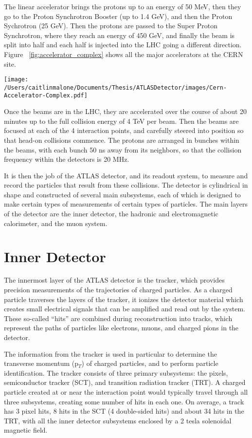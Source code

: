 The linear accelerator brings the protons up to an energy of 50 MeV, then they go to the Proton Synchrotron Booster (up to 1.4 GeV), and then the Proton Sychrotron (25 GeV).  Then the protons are passed to the Super Proton Synchrotron, where they reach an energy of 450 GeV, and finally the beam is split into half and each half is injected into the LHC going a different direction.  Figure ~\ref{fig:accelerator_complex} shows all the major accelerators at the CERN site.

\texttt{[image: /Users/caitlinmalone/Documents/Thesis/ATLASDetector/images/Cern-Accelerator-Complex.pdf]}\label{fig:accelerator_complex}

Once the beams are in the LHC, they are accelerated over the course of about 20 minutes up to the full collision energy of 4 TeV per beam.  Then the beams are focused at each of the 4 interaction points, and carefully steered into position so that head-on collisions commence.  The protons are arranged in bunches within the beams, with each bunch 50 ns away from its neighbors, so that the collision frequency within the detectors is 20 MHz.  

It is then the job of the ATLAS detector, and its readout system, to measure and record the particles that result from these collisions.  The detector is cylindrical in shape and constructed of several main subsystems, each of which is designed to make certain types of measurements of certain types of particles.  The main layers of the detector are the inner detector, the hadronic and electromagnetic calorimeter, and the muon system.



\section{Inner Detector}
The innermost layer of the ATLAS detector is the tracker, which provides precision measurements of the trajectories of charged particles.  As a charged particle traverses the layers of the tracker, it ionizes the detector material which creates small electrical signals that can be amplified and read out by the system.  These so-called ``hits'' are combined during reconstruction into tracks, which represent the paths of particles like electrons, muons, and charged pions in the detector.

The information from the tracker is used in particular to determine the transverse momentum (p$_T$) of charged particles, and to perform particle identification.  The tracker consists of three primary subsystems: the pixels, semiconductor tracker (SCT), and transition radiation tracker (TRT).  A charged particle created at or near the interaction point would typically travel through all three subsystems, creating some number of hits in each one.  On average, a track has 3 pixel hits, 8 hits in the SCT (4 double-sided hits) and about 34 hits in the TRT, with all the inner detector subsystems enclosed by a 2 tesla solenoidal magnetic field. 

